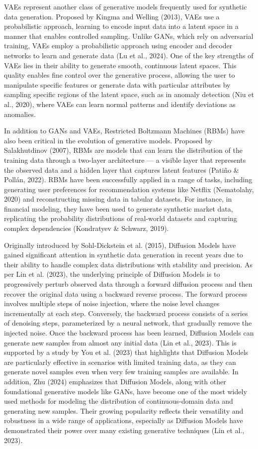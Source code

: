 \documentclass{article}
\begin{document}
VAEs represent another class of generative models frequently used for synthetic data generation. Proposed by Kingma and Welling (2013), VAEs use a probabilistic approach, learning to encode input data into a latent space in a manner that enables controlled sampling. Unlike GANs, which rely on adversarial training, VAEs  employ a probabilistic approach using encoder and decoder networks to learn and generate data (Lu et al., 2024). One of the key strengths of VAEs lies in their ability to generate smooth, continuous latent spaces. This quality enables fine control over the generative process, allowing the user to manipulate specific features or generate data with particular attributes by sampling specific regions of the latent space, such as in anomaly detection (Niu et al., 2020), where VAEs can learn normal patterns and identify deviations as anomalies.

In addition to GANs and VAEs, Restricted Boltzmann Machines (RBMs) have also been critical in the evolution of generative models. Proposed by Salakhutdinov (2007), RBMs are models that can learn the distribution of the training data through a two-layer architecture — a visible layer that represents the observed data and a hidden layer that captures latent features (Pati\~no \& Poll\'an, 2022).  RBMs have been successfully applied in a range of tasks, including generating user preferences for recommendation systems like Netflix (Nematolahy, 2020) and reconstructing missing data in tabular datasets. For instance, in financial modeling, they have been used to generate synthetic market data, replicating the probability distributions of real-world datasets and capturing complex dependencies (Kondratyev \& Schwarz, 2019).

Originally introduced by Sohl-Dickstein et al. (2015), Diffusion Models have gained significant attention in synthetic data generation in recent years due to their ability to handle complex data distributions with stability and precision. As per Lin et al. (2023), the underlying principle of Diffusion Models is to progressively perturb observed data through a forward diffusion process and then recover the original data using a backward reverse process. The forward process involves multiple steps of noise injection, where the noise level changes incrementally at each step. Conversely, the backward process consists of a series of denoising steps, parameterized by a neural network, that gradually remove the injected noise. Once the backward process has been learned, Diffusion Models can generate new samples from almost any initial data (Lin et al., 2023). This is supported by a study by You et al. (2023) that highlights that Diffusion Models are particularly effective in scenarios with limited training data, as they can generate novel samples even when very few training samples are available. In addition, Zhu (2024) emphasizes that Diffusion Models, along with other foundational generative models like GANs, have become one of the most widely used methods for modeling the distribution of continuous-domain data and generating new samples. Their growing popularity reflects their versatility and robustness in a wide range of applications, especially as Diffusion Models have demonstrated their power over many existing generative techniques (Lin et al., 2023).
\end{document}
